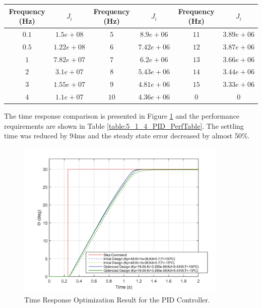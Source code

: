 \begin{table}[H]
	\label{table:5_1_4_PID_CostFunctionTable}
	\centering
	\resizebox{14cm}{!} {
		\begin{tabular}{|c|c|c|c|c|c|}
			\hline
			Frequency (Hz) & $J_i$ & Frequency (Hz) & $J_i$ & Frequency (Hz) & $J_i$ \\ \hline
			$0.1$ & $1.5e+08$ & $5$ & $8.9e+06$ & $11$ & $3.89e+06$ \\ \hline
			$0.5$ & $1.22e+08$ & $6$ & $7.42e+06$ & $12$ & $3.87e+06$ \\ \hline
			$1$ & $7.82e+07$ & $7$ & $6.2e+06$ & $13$ & $3.66e+06$ \\ \hline
			$2$ & $3.1e+07$ & $8$ & $5.43e+06$ & $14$ & $3.44e+06$ \\ \hline
			$3$ & $1.55e+07$ & $9$ & $4.81e+06$ & $15$ & $3.33e+06$ \\ \hline
			$4$ & $1.1e+07$ & $10$ & $4.36e+06$ & $0$ & $0$ \\ \hline
	\end{tabular}}
\end{table}

The time response comparison is presented in Figure \ref{fig:5_1_4_PID_TimeResp} and the performance requirements are shown in Table \ref{table:5_1_4_PID_PerfTable}. The settling time was reduced by 94ms and the steady state error decreased by almost 50\%. 

\begin{figure}[H]
	\centering
	\centerline{\includegraphics[width=0.9\textwidth]{Figuras/5.OptimizationResults/5-1-4-PID-TimeResponseComparison.jpg}}
	\caption{Time Response Optimization Result for the PID Controller.}
	\label{fig:5_1_4_PID_TimeResp}
\end{figure}

